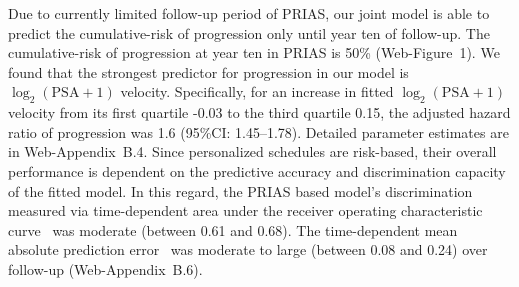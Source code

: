 Due to currently limited follow-up period of PRIAS, our joint model is able to predict the cumulative-risk of progression only until year ten of follow-up. The cumulative-risk of progression at year ten in PRIAS is 50\% (Web-Figure~1). We found that the strongest predictor for progression in our model is $\log_2(\mbox{PSA} + 1)$ velocity. Specifically, for an increase in fitted $\log_2(\mbox{PSA} + 1)$ velocity from its first quartile -0.03 to the third quartile 0.15, the adjusted hazard ratio of progression was 1.6 (95\%CI: 1.45--1.78). Detailed parameter estimates are in Web-Appendix~B.4. Since personalized schedules are risk-based, their overall performance is dependent on the predictive accuracy and discrimination capacity of the fitted model. In this regard, the PRIAS based model's discrimination measured via time-dependent area under the receiver operating characteristic curve~\citep{rizopoulos2011dynamic} was moderate (between 0.61 and 0.68). The time-dependent mean absolute prediction error~\citep{rizopoulos2011dynamic} was moderate to large (between 0.08 and 0.24) over follow-up (Web-Appendix~B.6).

